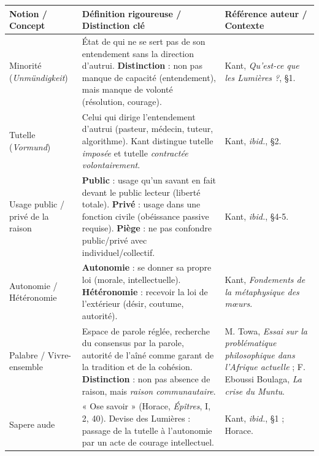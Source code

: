 \documentclass[11pt]{article}
\newcommand{\cle}[1]{{\popxbold\color{popdark}#1}}
\begin{document}
\begin{center}
\begin{tabularx}{\linewidth}{|l|X|X|}
\hline
\rowcolor{popblueL}
\textbf{Notion / Concept} & \textbf{Définition rigoureuse / Distinction clé} & \textbf{Référence auteur / Contexte} \\
\hline
\cle{Minorité} (\emph{Unmündigkeit}) & État de qui ne se sert pas de son entendement sans la direction d'autrui. \textbf{Distinction} : non pas manque de capacité (entendement), mais manque de volonté (résolution, courage). & Kant, \emph{Qu'est-ce que les Lumières ?}, §1. \\
\hline
\cle{Tutelle} (\emph{Vormund}) & Celui qui dirige l'entendement d'autrui (pasteur, médecin, tuteur, algorithme). Kant distingue tutelle \emph{imposée} et tutelle \emph{contractée volontairement}. & Kant, \emph{ibid.}, §2. \\
\hline
\cle{Usage public / privé de la raison} & \textbf{Public} : usage qu'un savant en fait devant le public lecteur (liberté totale). \textbf{Privé} : usage dans une fonction civile (obéissance passive requise). \textbf{Piège} : ne pas confondre public/privé avec individuel/collectif. & Kant, \emph{ibid.}, §4-5. \\
\hline
\cle{Autonomie / Hétéronomie} & \textbf{Autonomie} : se donner sa propre loi (morale, intellectuelle). \textbf{Hétéronomie} : recevoir la loi de l'extérieur (désir, coutume, autorité). & Kant, \emph{Fondements de la métaphysique des mœurs}. \\
\hline
\cle{Palabre} / \cle{Vivre-ensemble} & Espace de parole réglée, recherche du consensus par la parole, autorité de l'aîné comme garant de la tradition et de la cohésion. \textbf{Distinction} : non pas absence de raison, mais \emph{raison communautaire}. & M. Towa, \emph{Essai sur la problématique philosophique dans l'Afrique actuelle} ; F. Eboussi Boulaga, \emph{La crise du Muntu}. \\
\hline
\cle{Sapere aude} & « Ose savoir » (Horace, \emph{Épîtres}, I, 2, 40). Devise des Lumières : passage de la tutelle à l'autonomie par un acte de courage intellectuel. & Kant, \emph{ibid.}, §1 ; Horace. \\
\hline
\end{tabularx}
\end{center}
\end{document}
